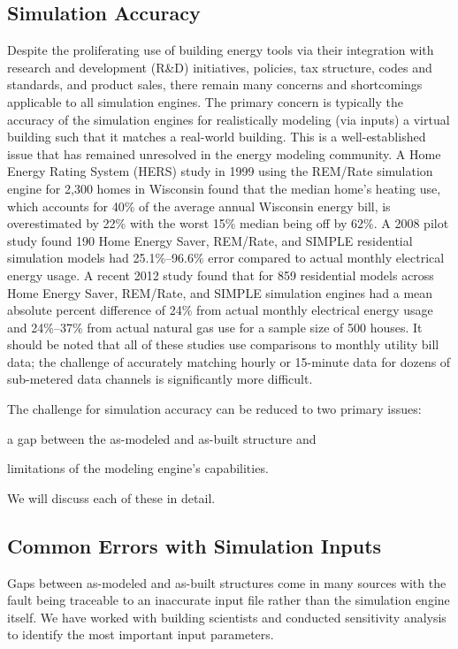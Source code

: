 \documentclass[preprint, review, 12pt]{elsarticle}
\begin{document}
\subsection{Simulation Accuracy}
Despite the proliferating use of building energy tools via their integration with research and development (R\&D) initiatives, policies, tax structure, codes and standards, and product sales, there remain many concerns and shortcomings applicable to all simulation engines. The primary concern is typically the accuracy of the simulation engines for realistically modeling (via inputs) a virtual building such that it matches a real-world building. This is a well-established issue that has remained unresolved in the energy modeling community. A Home Energy Rating System (HERS) study in 1999 \cite{cit:pigg2001} using the REM/Rate
simulation engine for 2,300 homes in Wisconsin found that the median home's heating use, which accounts for 40\% of the average annual Wisconsin energy bill, is overestimated by 22\% with the worst 15\% median being off by 62\%. A 2008 pilot study \cite{cit:earthadvantage2009} found 190 Home Energy Saver, REM/Rate, and SIMPLE residential simulation models had 25.1\%--96.6\% error compared to actual monthly electrical energy usage. A recent 2012 study \cite{cit:roberts2012} found that for 859 residential models across Home Energy Saver, REM/Rate, and SIMPLE simulation engines had a mean absolute percent difference of 24\% from actual monthly electrical energy usage and 24\%--37\% from actual natural gas use for a sample size of 500 houses. It should be noted that all of these studies use comparisons to monthly utility bill data; the challenge of accurately matching hourly or 15-minute data for dozens of sub-metered data channels is significantly more difficult.

The challenge for simulation accuracy can be reduced to two primary issues: \begin{inparaenum}[1)]
\item a gap between the as-modeled and as-built structure and 
\item limitations of the modeling engine's capabilities. 
\end{inparaenum}
We will discuss each of these in detail.

\subsection{Common Errors with Simulation Inputs}
Gaps between as-modeled and as-built structures come in many sources with the fault being traceable to an inaccurate input file rather than the simulation engine itself. We have worked with building scientists and conducted sensitivity analysis to identify the most important input parameters.
\end{document}
